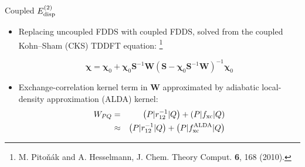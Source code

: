 \documentclass{beamer}
\newcommand\blfootnote[1]{%
  \begingroup
  \renewcommand\thefootnote{}\footnote{#1}%
  \addtocounter{footnote}{-1}%
  \endgroup
}
\begin{document}

    \begin{frame}{Coupled $E_{\rm{disp}}^{(2)}$}
        \begin{itemize}
            \item Replacing uncoupled FDDS with coupled FDDS, solved from the coupled Kohn--Sham (CKS) TDDFT equation:\blfootnote{M. Pito{\v{n}}{\'{a}}k and A. Hesselmann, J. Chem. Theory Comput. \textbf{6}, 168 (2010).}
            $$\boldsymbol{\chi} = \boldsymbol{\chi}_0 + \boldsymbol{\chi}_0 \mathbf{S}^{-1} \mathbf{W} \left( \mathbf{S} - \boldsymbol{\chi}_0 \mathbf{S}^{-1} \mathbf{W} \right)^{-1} \boldsymbol{\chi}_0$$
            \item Exchange-correlation kernel term in $\mathbf{W}$ approximated by adiabatic local-density approximation (ALDA) kernel:
            \begin{eqnarray}
                \nonumber
                W_{PQ} &=& \left( P | r_{12}^{-1} | Q \right) + \left( P | f_{\rm{xc}} | Q \right) \\ \nonumber
                & \approx & \left( P | r_{12}^{-1} | Q \right) + \left( P | f_{\rm{xc}}^{\rm{ALDA}} | Q \right)
            \end{eqnarray}
        \end{itemize}
    \end{frame}
\end{document}
